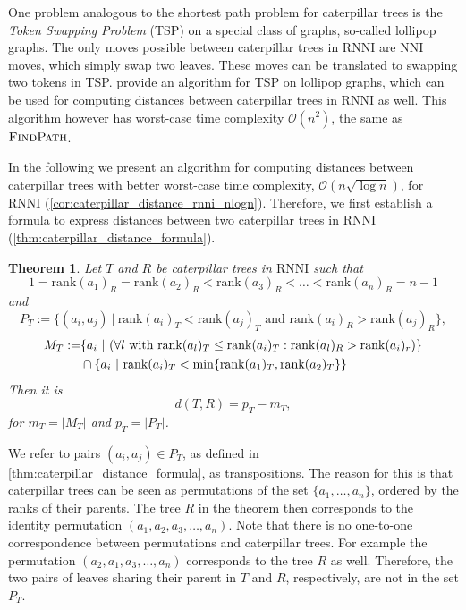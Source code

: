 \documentclass[11pt]{amsart}
\newtheorem{theorem}{Theorem}
\newcommand{\rnni}{\mathrm{RNNI}}
\newcommand{\findpath}{\textsc{FindPath}}
\newcommand{\rank}{\mathrm{rank}}
\newcommand{\nni}{\mathrm{NNI}}
\renewcommand{\O}{\mathcal O}
\begin{document}
One problem analogous to the shortest path problem for caterpillar trees is the \emph{Token Swapping Problem} (TSP) \autocite{Kawahara2017-ey} on a special class of graphs, so-called lollipop graphs.
The only moves possible between caterpillar trees in $\rnni$ are $\nni$ moves, which simply swap two leaves.
These moves can be translated to swapping two tokens in TSP.
\textcite{Kawahara2017-ey} provide an algorithm for TSP on lollipop graphs, which can be used for computing distances between caterpillar trees in $\rnni$ as well.
This algorithm however has worst-case time complexity $\O(n^2)$, the same as $\findpath$.

In the following we present an algorithm for computing distances between caterpillar trees with better worst-case time complexity, $\O(n \sqrt{\log n})$, for $\rnni$ (\autoref{cor:caterpillar_distance_rnni_nlogn}).
Therefore, we first establish a formula to express distances between two caterpillar trees in $\rnni$ (\autoref{thm:caterpillar_distance_formula}).

\begin{theorem}
	Let $T$ and $R$ be caterpillar trees in $\rnni$ such that \[1 = \rank(a_1)_R = \rank(a_2)_R < \rank(a_3)_R < \ldots < \rank(a_n)_R = n-1\]
	and
	\[P_T := \{(a_i,a_j)\ |\  \rank(a_i)_T < \rank(a_j)_T \text{ and } \rank(a_i)_R > \rank(a_j)_R\},\]
	\begin{align*}
		M_T := &\{a_i\ |\  (\forall l \textnormal{ with } \rank(a_l)_T \leq \rank(a_i)_T: \rank(a_l)_R > \rank(a_i)_r)\} \\
		& \cap \{a_i \ |\  \rank(a_i)_T < \min\{\rank(a_1)_T, \rank(a_2)_T\}\}
	\end{align*}
	Then it is
	\[d(T,R) = p_T - m_T,\]
	for ${m_T = |M_T|}$ and ${p_T = |P_T|}$.
	\label{thm:caterpillar_distance_formula}
\end{theorem}

We refer to pairs $(a_i,a_j) \in P_T$, as defined in \autoref{thm:caterpillar_distance_formula}, as transpositions.
The reason for this is that caterpillar trees can be seen as permutations of the set $\{a_1, \ldots, a_n\}$, ordered by the ranks of their parents.
The tree $R$ in the theorem then corresponds to the identity permutation $(a_1, a_2, a_3, \ldots, a_n)$.
Note that there is no one-to-one correspondence between permutations and caterpillar trees.
For example the permutation $(a_2, a_1, a_3, \ldots, a_n)$ corresponds to the tree $R$ as well.
Therefore, the two pairs of leaves sharing their parent in $T$ and $R$, respectively, are not in the set $P_T$.
\end{document}
